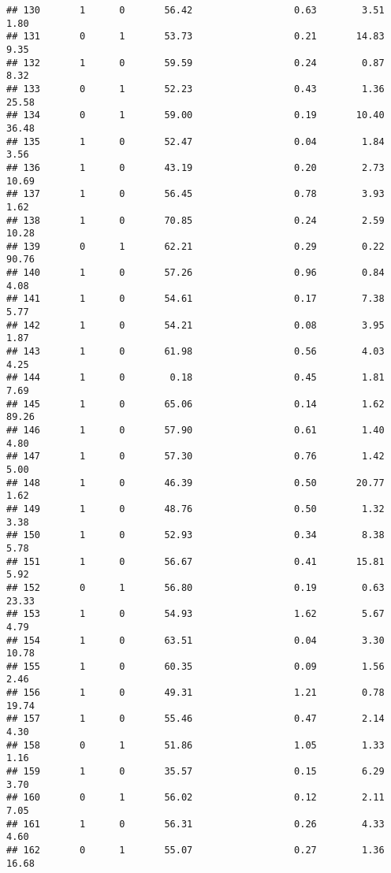 \documentclass[
]{article}
\begin{document}
\begin{verbatim}
## 130       1      0       56.42                  0.63        3.51        1.80
## 131       0      1       53.73                  0.21       14.83        9.35
## 132       1      0       59.59                  0.24        0.87        8.32
## 133       0      1       52.23                  0.43        1.36       25.58
## 134       0      1       59.00                  0.19       10.40       36.48
## 135       1      0       52.47                  0.04        1.84        3.56
## 136       1      0       43.19                  0.20        2.73       10.69
## 137       1      0       56.45                  0.78        3.93        1.62
## 138       1      0       70.85                  0.24        2.59       10.28
## 139       0      1       62.21                  0.29        0.22       90.76
## 140       1      0       57.26                  0.96        0.84        4.08
## 141       1      0       54.61                  0.17        7.38        5.77
## 142       1      0       54.21                  0.08        3.95        1.87
## 143       1      0       61.98                  0.56        4.03        4.25
## 144       1      0        0.18                  0.45        1.81        7.69
## 145       1      0       65.06                  0.14        1.62       89.26
## 146       1      0       57.90                  0.61        1.40        4.80
## 147       1      0       57.30                  0.76        1.42        5.00
## 148       1      0       46.39                  0.50       20.77        1.62
## 149       1      0       48.76                  0.50        1.32        3.38
## 150       1      0       52.93                  0.34        8.38        5.78
## 151       1      0       56.67                  0.41       15.81        5.92
## 152       0      1       56.80                  0.19        0.63       23.33
## 153       1      0       54.93                  1.62        5.67        4.79
## 154       1      0       63.51                  0.04        3.30       10.78
## 155       1      0       60.35                  0.09        1.56        2.46
## 156       1      0       49.31                  1.21        0.78       19.74
## 157       1      0       55.46                  0.47        2.14        4.30
## 158       0      1       51.86                  1.05        1.33        1.16
## 159       1      0       35.57                  0.15        6.29        3.70
## 160       0      1       56.02                  0.12        2.11        7.05
## 161       1      0       56.31                  0.26        4.33        4.60
## 162       0      1       55.07                  0.27        1.36       16.68

\end{verbatim}
\end{document}
